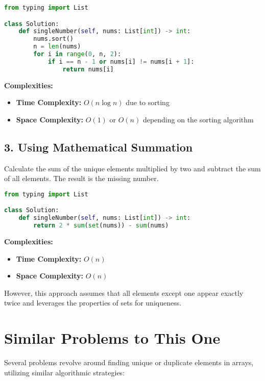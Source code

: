 \begin{lstlisting}[language=Python]
from typing import List

class Solution:
    def singleNumber(self, nums: List[int]) -> int:
        nums.sort()
        n = len(nums)
        for i in range(0, n, 2):
            if i == n - 1 or nums[i] != nums[i + 1]:
                return nums[i]
\end{lstlisting}

\textbf{Complexities:}
\begin{itemize}
    \item \textbf{Time Complexity:} \(O(n \log n)\) due to sorting
    \item \textbf{Space Complexity:} \(O(1)\) or \(O(n)\) depending on the sorting algorithm
\end{itemize}

\subsection*{3. Using Mathematical Summation}
Calculate the sum of the unique elements multiplied by two and subtract the sum of all elements. The result is the missing number.

\begin{lstlisting}[language=Python]
from typing import List

class Solution:
    def singleNumber(self, nums: List[int]) -> int:
        return 2 * sum(set(nums)) - sum(nums)
\end{lstlisting}

\textbf{Complexities:}
\begin{itemize}
    \item \textbf{Time Complexity:} \(O(n)\)
    \item \textbf{Space Complexity:} \(O(n)\)
\end{itemize}

However, this approach assumes that all elements except one appear exactly twice and leverages the properties of sets for uniqueness.

\section*{Similar Problems to This One}

Several problems revolve around finding unique or duplicate elements in arrays, utilizing similar algorithmic strategies:


